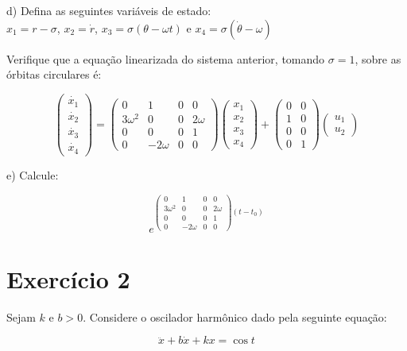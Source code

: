 \documentclass[11pt]{article}
\begin{document}
d) Defina as seguintes variáveis de estado:\\

$x_1 = r - \sigma$, $x_2 = \dot{r}$, $x_3 = \sigma(\theta - \omega t)$ e $x_4 = \sigma(\dot{\theta} - \omega)$

Verifique que a equação linearizada do sistema anterior, tomando $\sigma = 1$, sobre as órbitas circulares é:

$$
\begin{pmatrix}
\dot{x_1}\\ 
\dot{x_2}\\ 
\dot{x_3}\\ 
\dot{x_4}
\end{pmatrix} = \begin{pmatrix}
0 & 1 & 0 & 0\\ 
3\omega^2 & 0 & 0 & 2\omega\\ 
0 & 0 & 0 & 1\\ 
0 & -2\omega & 0 & 0
\end{pmatrix}
\begin{pmatrix}
x_1\\ 
x_2\\ 
x_3\\ 
x_4
\end{pmatrix} + 
\begin{pmatrix}
0 & 0\\ 
1 & 0\\ 
0 & 0\\ 
0 & 1
\end{pmatrix}
\begin{pmatrix}
u_1\\ 
u_2
\end{pmatrix}
$$

e) Calcule:

$$e^{\begin{pmatrix}
0 & 1 & 0 & 0\\ 
3\omega^2 & 0 & 0 & 2\omega\\ 
0 & 0 & 0 & 1\\ 
0 & -2\omega & 0 & 0
\end{pmatrix}(t-t_0)}$$

\section*{Exercício 2}

Sejam $k$ e $b > 0$. Considere o oscilador harmônico dado pela seguinte equação:

$$\ddot{x}+b\dot{x}+kx = \cos t$$
\end{document}
